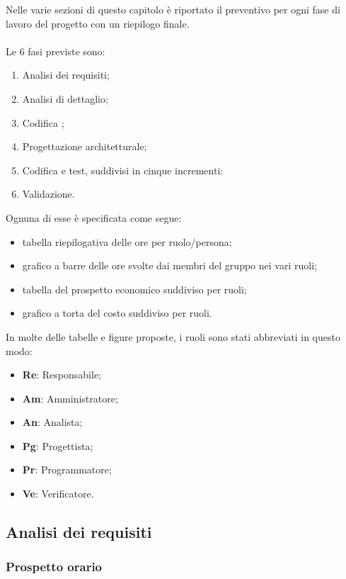 
Nelle varie sezioni di questo capitolo è riportato il preventivo per ogni fase di lavoro del progetto con un riepilogo finale.\\
\\Le 6 fasi previste sono:
\begin{enumerate}
	\item Analisi dei requisiti;
	\item Analisi di dettaglio;
	\item Codifica ;
	\item Progettazione architetturale;
	\item Codifica e test, suddivisi in cinque incrementi:
	\item Validazione.
\end{enumerate}
Ognuna di esse è specificata come segue:
\begin{itemize}
	\item tabella riepilogativa delle ore per ruolo/persona;
	\item grafico a barre delle ore svolte dai membri del gruppo nei vari ruoli;
	\item tabella del prospetto economico suddiviso per ruoli;
	\item grafico a torta del costo suddiviso per ruoli.
\end{itemize}
In molte delle tabelle e figure proposte, i ruoli sono stati abbreviati in questo modo:
\begin{itemize}
	\item \textbf{Re}: Responsabile;
	\item \textbf{Am}: Amministratore;
	\item \textbf{An}: Analista;
	\item \textbf{Pg}: Progettista;
	\item \textbf{Pr}: Programmatore;
	\item \textbf{Ve}: Verificatore.
\end{itemize}

\newpage

\subsection{Analisi dei requisiti}
	
	\subsubsection{Prospetto orario}
			

